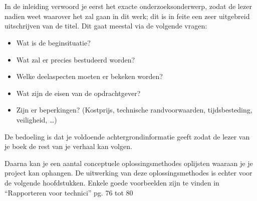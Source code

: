


\chapter{}%
\label{ch:inleiding}

In de inleiding verwoord je eerst het exacte onderzoeksonderwerp, zodat de lezer nadien weet waarover het zal gaan in dit werk; dit is in feite een zeer uitgebreid uitschrijven van de titel. Dit gaat meestal via de volgende vragen:
\begin{itemize}[]
    \item Wat is de beginsituatie?
    \item Wat zal er precies bestudeerd worden?
    \item Welke deelaspecten moeten er bekeken worden?
    \item Wat zijn de eisen van de opdrachtgever?
    \item Zijn er beperkingen? (Kostprijs, technische randvoorwaarden, tijdsbesteding, veiligheid, …)
\end{itemize}
De bedoeling is dat je voldoende achtergrondinformatie geeft zodat de lezer van je boek de rest van je verhaal
kan volgen.

Daarna kan je een aantal conceptuele oplossingsmethodes oplijsten waaraan je je project kan ophangen. De
uitwerking van deze oplossingsmethodes is echter voor de volgende hoofdstukken.
Enkele goede voorbeelden zijn te vinden in “Rapporteren voor technici” pg. 76 tot 80

